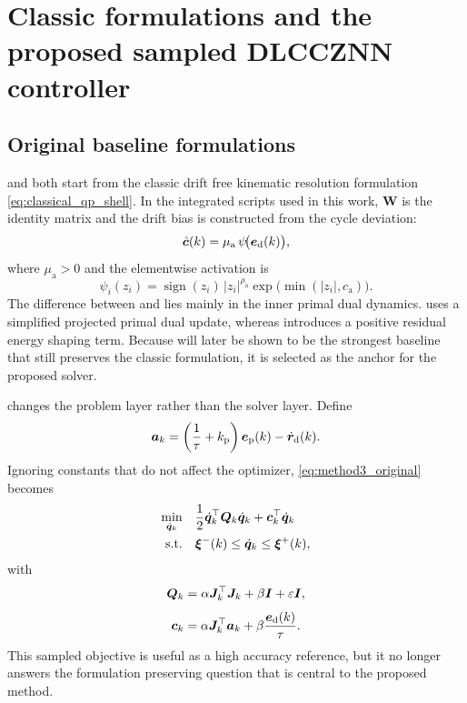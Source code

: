 \section{Classic formulations and the proposed sampled DLCCZNN controller}

\subsection{Original baseline formulations}

\methodone{} and \methodtwo{} both start from the classic drift free kinematic resolution formulation \eqref{eq:classical_qp_shell}. In the integrated scripts used in this work, $\bm{W}$ is the identity matrix and the drift bias is constructed from the cycle deviation:
\begin{equation}
  \hat{\bm{c}}(k) = \mu_{\mathrm{a}} \, \psi\!\bigl(\bm{e}_{\mathrm{d}}(k)\bigr),
\end{equation}
where $\mu_{\mathrm{a}} > 0$ and the elementwise activation is
\begin{equation}
  \psi_i(z_i)
  =
  \operatorname{sign}(z_i)\,|z_i|^{\rho_{\mathrm{a}}}
  \exp\!\bigl(\min(|z_i|,c_{\mathrm{a}})\bigr).
  \label{eq:drift_activation}
\end{equation}
The difference between \methodone{} and \methodtwo{} lies mainly in the inner primal dual dynamics. \methodone{} uses a simplified projected primal dual update, whereas \methodtwo{} introduces a positive residual energy shaping term. Because \methodtwo{} will later be shown to be the strongest baseline that still preserves the classic formulation, it is selected as the anchor for the proposed solver.

\methodthree{} changes the problem layer rather than the solver layer. Define
\begin{equation}
  \bm{a}_k
  =
  \left( \frac{1}{\tau} + k_{\mathrm{p}} \right)\bm{e}_{\mathrm{p}}(k) - \dot{\bm{r}}_{\mathrm{d}}(k).
  \label{eq:ak}
\end{equation}
Ignoring constants that do not affect the optimizer, \eqref{eq:method3_original} becomes
\begin{equation}
  \begin{aligned}
    \min_{\dot{\bm{q}}_k} \quad &
      \frac{1}{2}\dot{\bm{q}}_k^\top \bm{Q}_k \dot{\bm{q}}_k + \bm{c}_k^\top \dot{\bm{q}}_k \\
    \text{s.t.} \quad &
      \bm{\xi}^{-}(k) \le \dot{\bm{q}}_k \le \bm{\xi}^{+}(k),
  \end{aligned}
  \label{eq:method3_qp}
\end{equation}
with
\begin{equation}
  \bm{Q}_k = \alpha \bm{J}_k^\top \bm{J}_k + \beta \bm{I} + \varepsilon \bm{I},
  \label{eq:method3_Q}
\end{equation}
\begin{equation}
  \bm{c}_k
  =
  \alpha \bm{J}_k^\top \bm{a}_k
  +
  \beta \frac{\bm{e}_{\mathrm{d}}(k)}{\tau}.
  \label{eq:method3_c}
\end{equation}
This sampled objective is useful as a high accuracy reference, but it no longer answers the formulation preserving question that is central to the proposed method.

